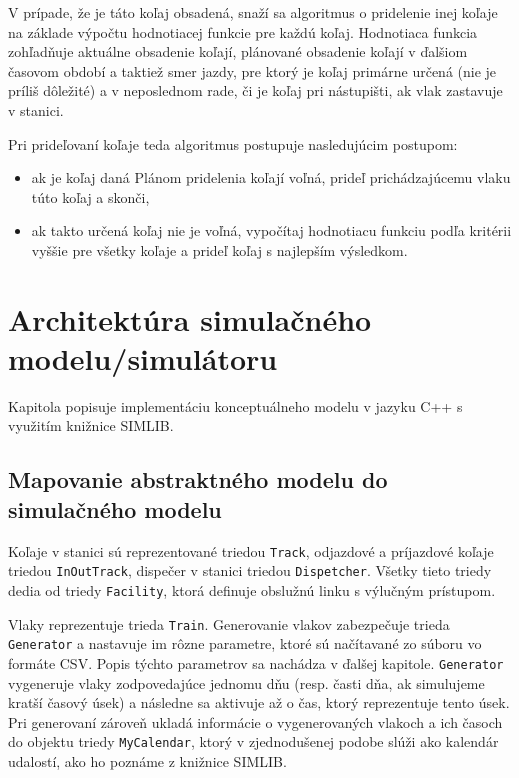 \documentclass[12pt,a4paper,titlepage,final]{article}
\begin{document}
V prípade, že je táto koľaj obsadená, snaží sa algoritmus o pridelenie inej koľaje na základe výpočtu hodnotiacej funkcie pre každú koľaj. Hodnotiaca funkcia zohľadňuje aktuálne obsadenie koľají,
plánované obsadenie koľají v ďalšiom časovom období a taktiež smer jazdy, pre ktorý je koľaj primárne určená (nie je príliš dôležité) a v neposlednom rade, či je koľaj pri nástupišti, ak vlak zastavuje v stanici.

\vspace{1em}
{\setlength{\parindent}{0cm}
Pri prideľovaní koľaje teda algoritmus postupuje nasledujúcim postupom:
\begin{itemize}
	\item ak je koľaj daná Plánom pridelenia koľají voľná, prideľ prichádzajúcemu vlaku
	túto koľaj a skonči,
	\item ak takto určená koľaj nie je voľná, vypočítaj hodnotiacu funkciu podľa kritérii vyššie pre všetky koľaje a prideľ koľaj s najlepším výsledkom.
\end{itemize}
}

\section{Architektúra simulačného modelu/simulátoru}

Kapitola popisuje implementáciu konceptuálneho modelu v jazyku C++ s využitím knižnice
SIMLIB.

\subsection{Mapovanie abstraktného modelu do simulačného modelu}

Koľaje v stanici sú reprezentované triedou \texttt{Track}, odjazdové a príjazdové koľaje triedou \texttt{InOutTrack}, dispečer v stanici triedou \texttt{Dispetcher}. Všetky tieto triedy dedia od triedy \texttt{Facility}, ktorá definuje obslužnú linku s výlučným prístupom.

Vlaky reprezentuje trieda \texttt{Train}. Generovanie vlakov zabezpečuje trieda
\texttt{Generator} a nastavuje im rôzne parametre, ktoré sú načítavané zo súboru vo formáte CSV.
Popis týchto parametrov sa nachádza v ďalšej kapitole. \texttt{Generator} vygeneruje
vlaky zodpovedajúce jednomu dňu (resp. časti dňa, ak simulujeme kratší časový úsek) a následne
sa aktivuje až o čas, ktorý reprezentuje tento úsek. Pri generovaní zároveň ukladá
informácie o vygenerovaných vlakoch a ich časoch do objektu triedy \texttt{MyCalendar}, ktorý
v zjednodušenej podobe slúži ako kalendár udalostí, ako ho poznáme z knižnice SIMLIB.
\end{document}
